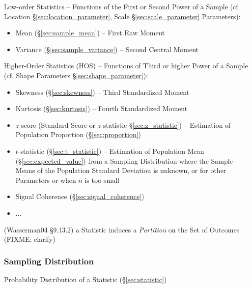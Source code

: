 Low-order Statistics -- Functions of the First or Second Power of a Sample (cf.
Location \S\ref{sec:location_parameter}, Scale \S\ref{sec:scale_parameter}
Parameters):
\begin{itemize}
  \item Mean (\S\ref{sec:sample_mean}) -- First Raw Moment
  \item Variance (\S\ref{sec:sample_variance}) -- Second Central Moment
\end{itemize}

Higher-Order Statistics (HOS) -- Functions of Third or higher Power of a Sample
(cf. Shape Parameters \S\ref{sec:shape_parameter}):
\begin{itemize}
  \item Skewness (\S\ref{sec:skewness}) -- Third Standardized Moment
  \item Kurtosis (\S\ref{sec:kurtosis}) -- Fourth Standardized Moment
\end{itemize}

\asterism

\begin{itemize}
  \item $z$-score (Standard Score or $z$-statistic \S\ref{sec:z_statistic})
    -- Estimation of Population Proportion (\S\ref{sec:proportion})
  \item $t$-statistic (\S\ref{sec:t_statistic}) -- Estimation of Population Mean
    (\S\ref{sec:expected_value}) from a Sampling Distribution where the Sample
    Means of the Population Standard Deviation is unknown, or for other
    Parameters or when $n$ is too small
\end{itemize}

\asterism

\begin{itemize}
  \item Signal Coherence (\S\ref{sec:signal_coherence})
  \item ...
\end{itemize}

\asterism

(Wasserman04 \S9.13.2) a Statistic induces a \emph{Partition} on the Set of
Outcomes (FIXME: clarify)



\subsubsection{Sampling Distribution}\label{sec:sampling_distribution}

Probability Distribution of a Statistic (\S\ref{sec:statistic})

